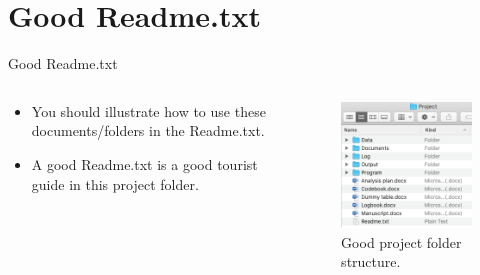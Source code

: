 \section{Good Readme.txt}	
\begin{frame}{Good Readme.txt}
\begin{columns}
	\begin{column}{0.5\textwidth} 
	\begin{itemize}
	\item You should illustrate how to use these documents/folders in the Readme.txt. 
	\item  A good Readme.txt is a good tourist guide in this project folder.

	\end{itemize}
	\end{column}
	
	\begin{column}{0.5\textwidth}
	\begin{figure}
			\includegraphics[scale=0.4]{image/structure}
			\caption{Good project folder structure.}
	\end{figure}
	\end{column}
	\end{columns}
\end{frame}
